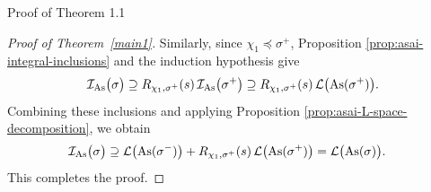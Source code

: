 \documentclass[12pt,reqno]{amsart}
\numberwithin{equation}{section}%
\numberwithin{equation}{subsection}
\theoremstyle{definition}
\theoremstyle{remark}
\begin{document}
\begin{section}{Proof of Theorem 1.1}
\begin{proof}[Proof of Theorem~\ref{main1}]
Similarly, since $\chi_1\preceq\sigma^+$, Proposition
\ref{prop:asai-integral-inclusions} and the induction hypothesis give
\[
\mathcal{I}_{\rm As}\bigl(\sigma\bigr)
\supseteq
R_{\chi_1,\sigma^+}(s)\,
\mathcal{I}_{\rm As}\bigl(\sigma^+\bigr)
\supseteq
R_{\chi_1,\sigma^+}(s)\,
\mathcal{L}\bigl({\rm As}(\sigma^+)\bigr).
\]
Combining these inclusions and applying Proposition
\ref{prop:asai-L-space-decomposition}, we obtain
\[
\begin{aligned}
\mathcal{I}_{\rm As}\bigl(\sigma\bigr)
&\supseteq
\mathcal{L}\bigl({\rm As}(\sigma^-)\bigr)
+
R_{\chi_1,\sigma^+}(s)\,
\mathcal{L}\bigl({\rm As}(\sigma^+)\bigr)
=
\mathcal{L}\bigl({\rm As}(\sigma)\bigr).
\end{aligned}
\]
This completes the proof.
\end{proof}
    
\end{section}
\end{document}
